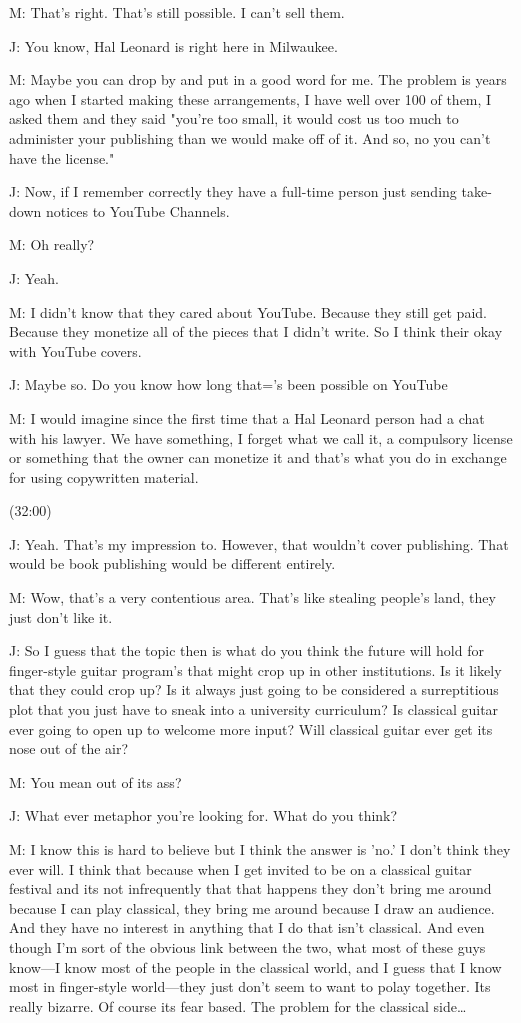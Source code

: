 \documentclass[11pt]{article}
\begin{document}
M: That's right. That's still possible. I can't sell them.

J: You know, Hal Leonard is right here in Milwaukee.

M: Maybe you can drop by and put in a good word for me. The problem is years ago when I started making these arrangements, I have well over 100 of them, I asked them and they said "you're too small, it would cost us too much to administer your publishing than we would make off of it. And so, no you can't have the license." 

J: Now, if I remember correctly they have a full-time person just sending take-down notices to YouTube Channels.

M: Oh really?

J: Yeah. 

M: I didn't know that they cared about YouTube. Because they still get paid.  Because they monetize all of the pieces that I didn't write. So I think their okay with YouTube covers. 

J: Maybe so. Do you know how long that='s been possible on YouTube

M: I would imagine since the first time that a Hal Leonard person had a chat with his lawyer. We have something, I forget what we call it, a compulsory license or something that the owner can monetize it and that's what you do in exchange for using copywritten material.

(32:00)

J: Yeah. That's my impression to. However, that wouldn't cover publishing. That would be book publishing would be different entirely.

M: Wow, that's a very contentious area. That's like stealing people's land, they just don't like it. 

J: So I guess that the topic then is what do you think the future will hold for finger-style guitar program's that might crop up in other institutions. Is it likely that they could crop up? Is it always just going to be considered a surreptitious plot that you just have to sneak into a university curriculum? Is classical guitar ever going to open up to welcome more input? Will classical guitar ever get its nose out of the air?

M: You mean out of its ass?

J: What ever metaphor you're looking for. What do you think?

M: I know this is hard to believe but I think the answer is 'no.' I don't think they ever will. I think that because when I get invited to be on a classical guitar festival and its not infrequently that that happens they don't bring me around because I can play classical, they bring me around because I draw an audience. And they have no interest in anything that I do that isn't classical. And even though I'm sort of the obvious link between the two, what most of these guys know—I know most of the people in the classical world, and I guess that I know most in finger-style world—they just don't seem to want to polay together. Its really bizarre. Of course its fear based. The problem for the classical side…
\end{document}
